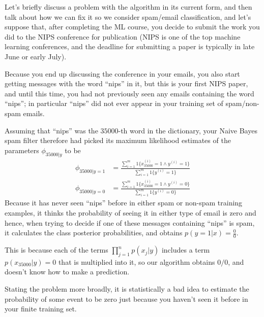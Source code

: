 Let’s briefly discuss a problem with the algorithm in its current form, and then talk about how we can fix it
so we consider spam/email classification, and let’s suppose that, after completing the ML course,
you decide to submit the work you did to the NIPS conference for publication (NIPS is one of the top 
machine learning conferences, and the deadline for submitting a paper is typically in late June or early July).

Because you end up discussing the conference in your emails, you also start getting messages 
with the word “nips” in it, but this is your first NIPS paper, and until this time, you had not previously
seen any emails containing the word “nips”; in particular “nips” did not ever appear in your training set
of spam/non-spam emails.

Assuming that “nips” was the $35000$-th word in the dictionary, your Naive Bayes spam filter therefore
had picked its maximum likelihood estimates of the parameters $\phi_{35000| y}$ to be
\begin{align*}
    \phi_{35000 | y = 1} & = \frac{\sum _{i=1}^m 1\{x_{35000}^{(i)} = 1 \land y^{(i)} = 1\}}
                                  {\sum _{i=1}^m 1\{y^{(i)} = 1\}} \\
    \phi_{35000 | y = 0} & = \frac{\sum _{i=1}^m 1\{x_{35000}^{(i)} = 1 \land y^{(i)} = 0\}}
                                  {\sum _{i=1}^m 1\{y^{(i)} = 0\}}
\end{align*}
Because it has never seen “nips” before in either spam or non-spam training examples, it thinks 
the probability of seeing it in either type of email is zero and hence, when trying to decide 
if one of these messages containing “nips” is spam, it calculates the class posterior probabilities, 
and obtains $p(y = 1 | x) = \frac{0}{0}$.

This is because each of the terms $\prod _{j=1}^n p(x_j | y)$ includes a term $p(x_{35000} | y) = 0$ 
that is multiplied into it, so our algorithm obtains $0 / 0$, and doesn’t know how to make a prediction.

Stating the problem more broadly, it is statistically a bad idea to estimate the probability of some event
to be zero just because you haven’t seen it before in your finite training set.

